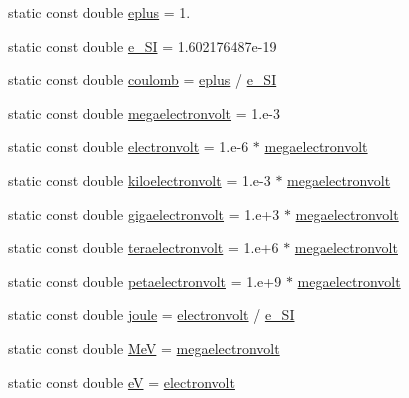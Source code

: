 \begin{DoxyCompactItemize}
\item 
static const double \hyperlink{namespacedd4hep_a96ccff254b6dcebf179c3630f6205857}{eplus} = 1.
\item 
static const double \hyperlink{namespacedd4hep_a18365e1a8b0f1730924219e336e11e9f}{e\_\-SI} = 1.602176487e-\/19
\item 
static const double \hyperlink{namespacedd4hep_a399f2340c615066766d822ce9c9781b7}{coulomb} = \hyperlink{namespacedd4hep_a96ccff254b6dcebf179c3630f6205857}{eplus} / \hyperlink{namespacedd4hep_a18365e1a8b0f1730924219e336e11e9f}{e\_\-SI}
\item 
static const double \hyperlink{namespacedd4hep_a4e39beba039f7a6bda24a7031c121b2a}{megaelectronvolt} = 1.e-\/3
\item 
static const double \hyperlink{namespacedd4hep_a849fe8dd27af5a22a8d7891687a4d499}{electronvolt} = 1.e-\/6 $\ast$ \hyperlink{namespacedd4hep_a4e39beba039f7a6bda24a7031c121b2a}{megaelectronvolt}
\item 
static const double \hyperlink{namespacedd4hep_a05014d49c7c5438820adf620633249e7}{kiloelectronvolt} = 1.e-\/3 $\ast$ \hyperlink{namespacedd4hep_a4e39beba039f7a6bda24a7031c121b2a}{megaelectronvolt}
\item 
static const double \hyperlink{namespacedd4hep_ac36e148fcf16a0ffd9061c13ba225659}{gigaelectronvolt} = 1.e+3 $\ast$ \hyperlink{namespacedd4hep_a4e39beba039f7a6bda24a7031c121b2a}{megaelectronvolt}
\item 
static const double \hyperlink{namespacedd4hep_ac482cce1ba221816734b1a3384f958d9}{teraelectronvolt} = 1.e+6 $\ast$ \hyperlink{namespacedd4hep_a4e39beba039f7a6bda24a7031c121b2a}{megaelectronvolt}
\item 
static const double \hyperlink{namespacedd4hep_a096cb423758a909c122182a3eed457d1}{petaelectronvolt} = 1.e+9 $\ast$ \hyperlink{namespacedd4hep_a4e39beba039f7a6bda24a7031c121b2a}{megaelectronvolt}
\item 
static const double \hyperlink{namespacedd4hep_a8cdc11c61e5f953baede59569544a324}{joule} = \hyperlink{namespacedd4hep_a849fe8dd27af5a22a8d7891687a4d499}{electronvolt} / \hyperlink{namespacedd4hep_a18365e1a8b0f1730924219e336e11e9f}{e\_\-SI}
\item 
static const double \hyperlink{namespacedd4hep_a6dee62809c6ee54d2fc90671f4dc8b91}{MeV} = \hyperlink{namespacedd4hep_a4e39beba039f7a6bda24a7031c121b2a}{megaelectronvolt}
\item 
static const double \hyperlink{namespacedd4hep_a17b06ecf4141c435b68b9873d0474460}{eV} = \hyperlink{namespacedd4hep_a849fe8dd27af5a22a8d7891687a4d499}{electronvolt}

\end{DoxyCompactItemize}
